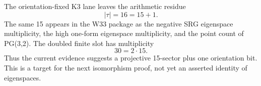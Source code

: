 
\makeatletter
{}
\makeatother
\providecommand{\PSp}{\mathrm{PSp}}
\providecommand{\Aut}{\mathrm{Aut}}
\providecommand{\spec}{\operatorname{spec}}


\begin{remark}
\label{rem:projective-fifteen-sector}
The orientation-fixed K3 lane leaves the arithmetic residue
\[
  |\tau|=16=15+1.
\]
The same 15 appears in the W33 package as the negative SRG eigenspace
multiplicity, the high one-form eigenspace multiplicity, and the point count of
PG(3,2).  The doubled finite slot has multiplicity
\[
  30=2\cdot15.
\]
Thus the current evidence suggests a projective 15-sector plus one orientation
bit.  This is a target for the next isomorphism proof, not yet an asserted
identity of eigenspaces.
\end{remark}
